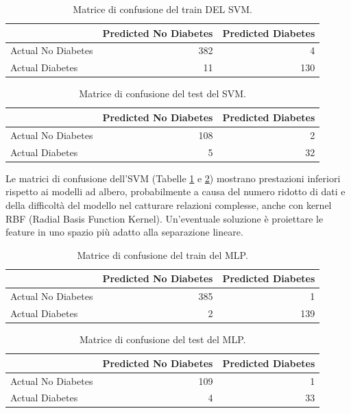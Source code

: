 \documentclass[conference]{IEEEtran}
\begin{document}
\begin{table}[H]
\centering
\small
\begin{tabular}{lrr}
\toprule
 & Predicted No Diabetes & Predicted Diabetes \\
\midrule
Actual No Diabetes & 382 & 4 \\
Actual Diabetes & 11 & 130 \\
\bottomrule
\end{tabular}
\caption{Matrice di confusione del train DEL SVM.}
\label{tab:SVM_CF_TRAIN}
\end{table}

\begin{table}[H]
\centering
\small
\begin{tabular}{lrr}
\toprule
 & Predicted No Diabetes & Predicted Diabetes \\
\midrule
Actual No Diabetes & 108 & 2 \\
Actual Diabetes & 5 & 32 \\
\bottomrule
\end{tabular}
\caption{Matrice di confusione del test del SVM.}
\label{tab:SVM_CF_TEST}
\end{table}
Le matrici di confusione dell’SVM (Tabelle \ref{tab:SVM_CF_TRAIN} e \ref{tab:SVM_CF_TEST}) mostrano prestazioni inferiori rispetto ai modelli ad albero, probabilmente a causa del numero ridotto di dati e della difficoltà del modello nel catturare relazioni complesse, anche con kernel RBF (Radial Basis Function Kernel). Un’eventuale soluzione è proiettare le feature in uno spazio più adatto alla separazione lineare.

\begin{table}[H]
\centering
\small
\begin{tabular}{lrr}
\toprule
 & Predicted No Diabetes & Predicted Diabetes \\
\midrule
Actual No Diabetes & 385 & 1 \\
Actual Diabetes & 2 & 139 \\
\bottomrule
\end{tabular}
\caption{Matrice di confusione del train del MLP.}
\label{tab:MLP_CF_TRAIN}
\end{table}

\begin{table}[H]
\centering
\small
\begin{tabular}{lrr}
\toprule
 & Predicted No Diabetes & Predicted Diabetes \\
\midrule
Actual No Diabetes & 109 & 1 \\
Actual Diabetes & 4 & 33 \\
\bottomrule
\end{tabular}
\caption{Matrice di confusione del test del MLP.}
\label{tab:MLP_CF_TEST}
\end{table}
\end{document}
